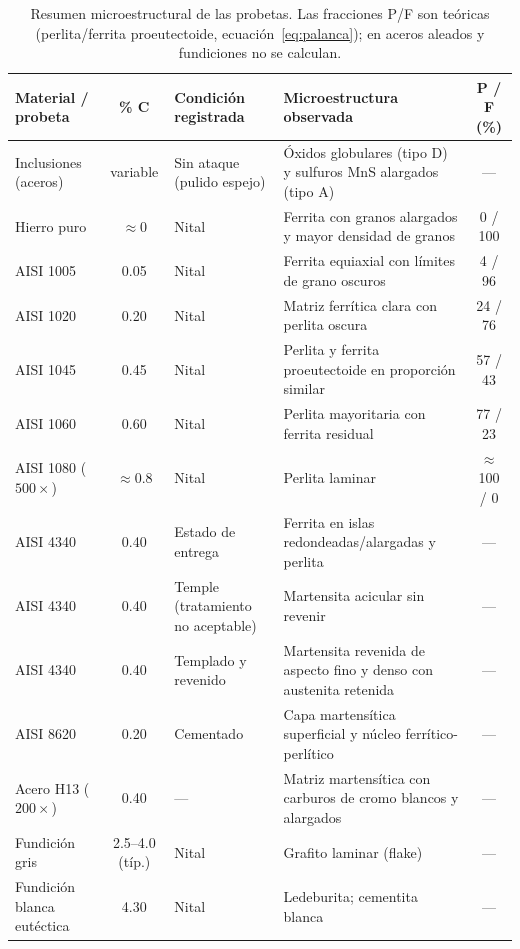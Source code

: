 \documentclass[journal,11pt]{IEEEtran}
\begin{document}
\begin{table}[!t]
\centering
\caption{Resumen microestructural de las probetas. Las fracciones P/F son teóricas (perlita/ferrita proeutectoide, ecuación~\eqref{eq:palanca}); en aceros aleados y fundiciones no se calculan.}
\label{tab:resumen_muestras}
\renewcommand{\arraystretch}{1.2}
\footnotesize
\begin{tabularx}{\textwidth}{@{} >{\raggedright\arraybackslash}p{3.1cm} c >{\raggedright\arraybackslash}p{3.4cm} >{\raggedright\arraybackslash}X c @{}}
\toprule
\textbf{Material / probeta} & \textbf{\% C} & \textbf{Condición registrada} & \textbf{Microestructura observada} & \textbf{P / F (\%)} \\ \midrule
Inclusiones (aceros) & variable & Sin ataque (pulido espejo) & Óxidos globulares (tipo D) y sulfuros MnS alargados (tipo A) & --- \\
Hierro puro & $\approx 0$ & Nital & Ferrita con granos alargados y mayor densidad de granos & 0 / 100 \\
AISI 1005 & 0.05 & Nital & Ferrita equiaxial con límites de grano oscuros & 4 / 96 \\
AISI 1020 & 0.20 & Nital & Matriz ferrítica clara con perlita oscura & 24 / 76 \\
AISI 1045 & 0.45 & Nital & Perlita y ferrita proeutectoide en proporción similar & 57 / 43 \\
AISI 1060 & 0.60 & Nital & Perlita mayoritaria con ferrita residual & 77 / 23 \\
AISI 1080 ($500\times$) & $\approx 0.8$ & Nital & Perlita laminar & $\approx$ 100 / 0 \\
AISI 4340 & 0.40 & Estado de entrega & Ferrita en islas redondeadas/alargadas y perlita & --- \\
AISI 4340 & 0.40 & Temple (tratamiento no aceptable) & Martensita acicular sin revenir & --- \\
AISI 4340 & 0.40 & Templado y revenido & Martensita revenida de aspecto fino y denso con austenita retenida & --- \\
AISI 8620 & 0.20 & Cementado & Capa martensítica superficial y núcleo ferrítico-perlítico & --- \\
Acero H13 ($200\times$) & 0.40 & --- & Matriz martensítica con carburos de cromo blancos y alargados & --- \\
Fundición gris & 2.5--4.0 (típ.) & Nital & Grafito laminar (flake) & --- \\
Fundición blanca eutéctica & 4.30 & Nital & Ledeburita; cementita blanca & --- \\ \bottomrule
\end{tabularx}
\end{table}
\end{document}
